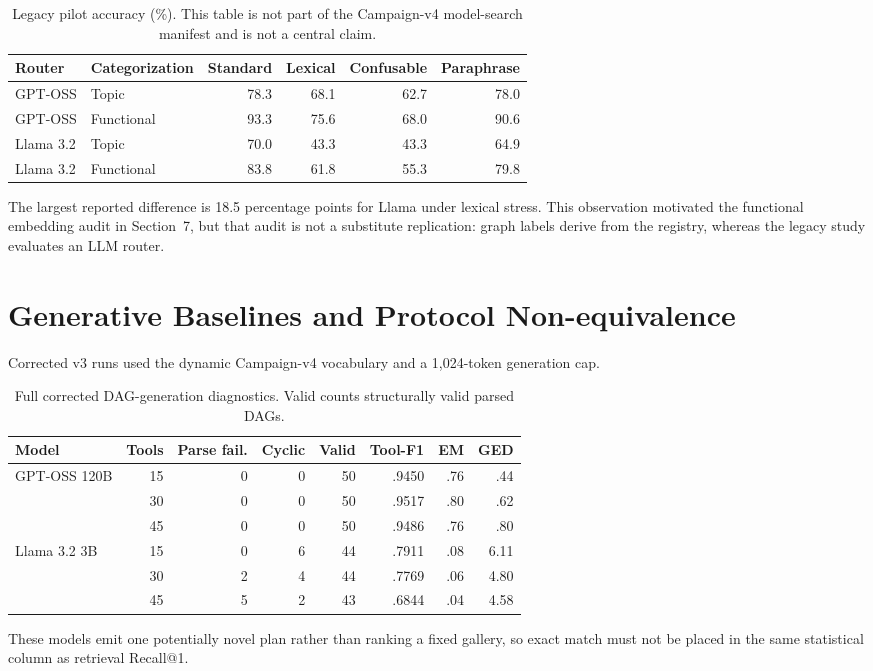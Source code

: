 \documentclass{article}
\begin{document}
\begin{table}[h]
\caption{Legacy pilot accuracy (\%).  This table is not part of the Campaign-v4 model-search manifest and is not a central claim.}
\centering
\small
\begin{tabular}{llrrrr}
\toprule
Router & Categorization & Standard & Lexical & Confusable & Paraphrase \\
\midrule
GPT-OSS & Topic & 78.3 & 68.1 & 62.7 & 78.0 \\
GPT-OSS & Functional & 93.3 & 75.6 & 68.0 & 90.6 \\
Llama 3.2 & Topic & 70.0 & 43.3 & 43.3 & 64.9 \\
Llama 3.2 & Functional & 83.8 & 61.8 & 55.3 & 79.8 \\
\bottomrule
\end{tabular}
\end{table}

The largest reported difference is 18.5 percentage points for Llama under lexical stress.
This observation motivated the functional embedding audit in Section~7, but that audit is not a substitute replication: graph labels derive from the registry, whereas the legacy study evaluates an LLM router.

\section{Generative Baselines and Protocol Non-equivalence}

Corrected v3 runs used the dynamic Campaign-v4 vocabulary and a 1,024-token generation cap.
\begin{table}[h]
\caption{Full corrected DAG-generation diagnostics. Valid counts structurally valid parsed DAGs.}
\centering
\scriptsize
\begin{tabular}{lrrrrrrr}
\toprule
Model & Tools & Parse fail. & Cyclic & Valid & Tool-F1 & EM & GED \\
\midrule
GPT-OSS 120B & 15 & 0 & 0 & 50 & .9450 & .76 & .44 \\
             & 30 & 0 & 0 & 50 & .9517 & .80 & .62 \\
             & 45 & 0 & 0 & 50 & .9486 & .76 & .80 \\
Llama 3.2 3B & 15 & 0 & 6 & 44 & .7911 & .08 & 6.11 \\
              & 30 & 2 & 4 & 44 & .7769 & .06 & 4.80 \\
              & 45 & 5 & 2 & 43 & .6844 & .04 & 4.58 \\
\bottomrule
\end{tabular}
\end{table}
These models emit one potentially novel plan rather than ranking a fixed gallery, so exact match must not be placed in the same statistical column as retrieval Recall@1.
\end{document}
